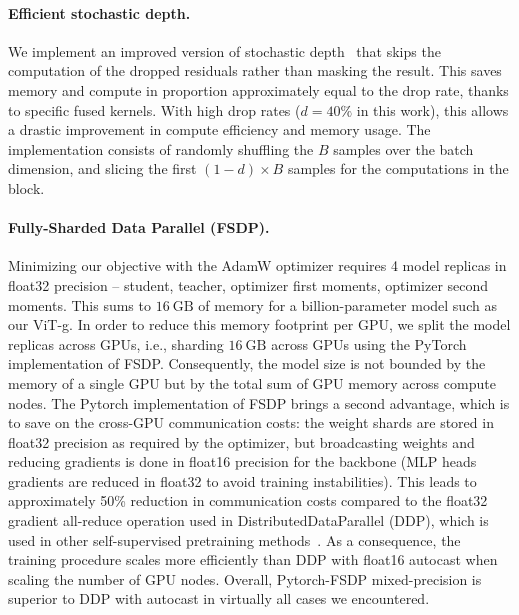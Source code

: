 \paragraph{Efficient stochastic depth.}
We implement an improved version of stochastic depth~\citep{huang2016deep} that skips the computation of the dropped residuals rather than masking the result. 
This saves memory and compute in proportion approximately equal to the drop rate, thanks to specific fused kernels. 
With high drop rates ($d = 40\%$ in this work), this allows a drastic improvement in compute efficiency and memory usage. 
The implementation consists of randomly shuffling the $B$ samples over the batch dimension, and slicing the first $(1-d) \times B$ samples for the computations in the block. 

\paragraph{Fully-Sharded Data Parallel (FSDP).} 
Minimizing our objective with the AdamW optimizer requires 4 model replicas in float32 precision  -- student, teacher, optimizer first moments, optimizer second moments. 
This sums to $16~\mathrm{GB}$ of memory for a billion-parameter model such as our ViT-g. 
In order to reduce this memory footprint per GPU, we split the model replicas across GPUs, i.e., sharding $16~\mathrm{GB}$ across GPUs using the PyTorch implementation of FSDP. 
Consequently, the model size is not bounded by the memory of a single GPU but by the total sum of GPU memory across compute nodes.
The Pytorch implementation of FSDP brings a second advantage, which is to save on the cross-GPU communication costs: the weight shards are stored in float32 precision as required by the optimizer, but broadcasting weights and reducing gradients is done in float16 precision for the backbone (MLP heads gradients are reduced in float32 to avoid training instabilities). 
This leads to approximately 50\% reduction in communication costs compared to the float32 gradient all-reduce operation used in DistributedDataParallel (DDP), which is used in other self-supervised pretraining methods~\citep{caron2021emerging,zhou2021ibot}. 
As a consequence, the training procedure scales more efficiently than DDP with float16 autocast when scaling the number of GPU nodes.
Overall, Pytorch-FSDP mixed-precision is superior to DDP with autocast in virtually all cases we encountered. 


